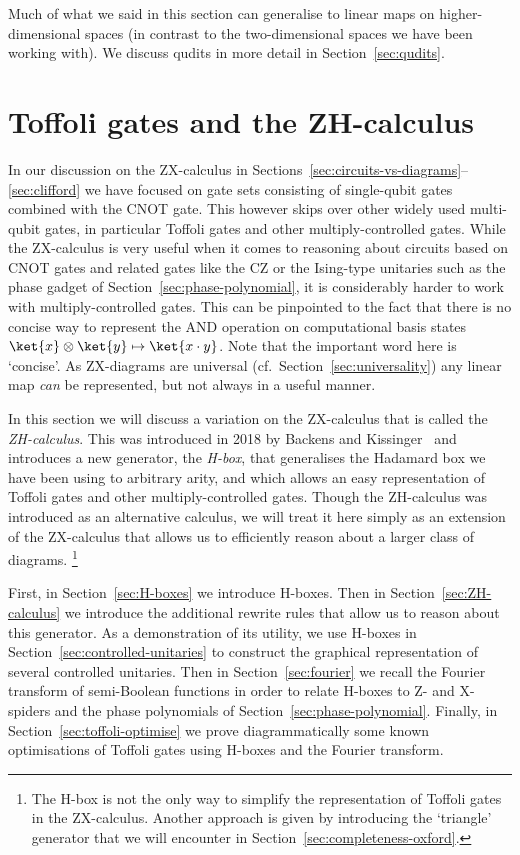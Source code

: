 \documentclass[a4paper,onecolumn,superscriptaddress,11pt,%
				unpublished,%
				allowfontchageintitle,%
				]{quantumarticle}
\begin{document}
Much of what we said in this section can generalise to linear maps on higher-dimensional spaces (in contrast to the two-dimensional spaces we have been working with). We discuss qudits in more detail in Section~\ref{sec:qudits}.


\section{Toffoli gates and the ZH-calculus}\label{sec:ZH}

In our discussion on the ZX-calculus in Sections~\ref{sec:circuits-vs-diagrams}--\ref{sec:clifford} we have focused on gate sets consisting of single-qubit gates combined with the CNOT gate. This however skips over other widely used multi-qubit gates, in particular Toffoli gates and other multiply-controlled gates.
While the ZX-calculus is very useful when it comes to reasoning about circuits based on CNOT gates and related gates like the CZ or the Ising-type unitaries such as the phase gadget of Section~\ref{sec:phase-polynomial}, it is considerably harder to work with multiply-controlled gates.
This can be pinpointed to the fact that there is no concise way to represent the AND operation on computational basis states $\ket{x}\otimes\ket{y}\mapsto \ket{x\cdot y}$. Note that the important word here is `concise'. As ZX-diagrams are universal (cf.~Section~\ref{sec:universality}) any linear map \emph{can} be represented, but not always in a useful manner.

In this section we will discuss a variation on the ZX-calculus that is called the \emph{ZH-calculus}. This was introduced in 2018 by Backens and Kissinger~\cite{backens2018zhcalculus} and introduces a new generator, the \emph{H-box}, that generalises the Hadamard box we have been using to arbitrary arity, and which allows an easy representation of Toffoli gates and other multiply-controlled gates.
Though the ZH-calculus was introduced as an alternative calculus, we will treat it here simply as an extension of the ZX-calculus that allows us to efficiently reason about a larger class of diagrams.%
\footnote{The H-box is not the only way to simplify the representation of Toffoli gates in the ZX-calculus. Another approach is given by introducing the `triangle' generator that we will encounter in Section~\ref{sec:completeness-oxford}.}

First, in Section~\ref{sec:H-boxes} we introduce H-boxes.
Then in Section~\ref{sec:ZH-calculus} we introduce the additional rewrite rules that allow us to reason about this generator.
As a demonstration of its utility, we use H-boxes in Section~\ref{sec:controlled-unitaries} to construct the graphical representation of several controlled unitaries.
Then in Section~\ref{sec:fourier} we recall the Fourier transform of semi-Boolean functions in order to relate H-boxes to Z- and X-spiders and the phase polynomials of Section~\ref{sec:phase-polynomial}.
Finally, in Section~\ref{sec:toffoli-optimise} we prove diagrammatically some known optimisations of Toffoli gates using H-boxes and the Fourier transform.
\end{document}

